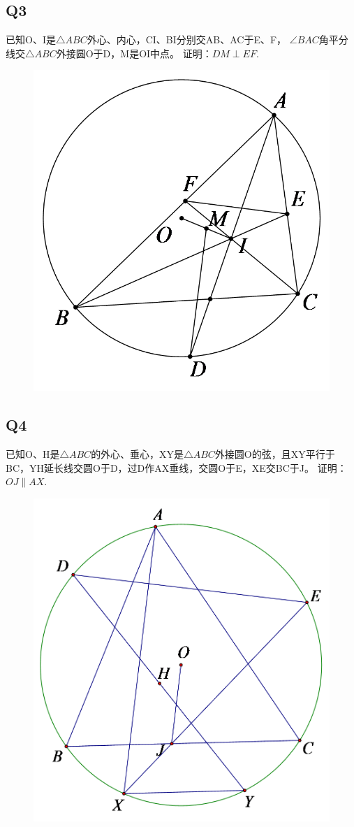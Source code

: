 \documentclass{article}
\begin{document}
\subsection{Q3}
已知O、I是$\triangle ABC$外心、内心，CI、BI分别交AB、AC于E、F，
$\angle BAC$角平分线交$\triangle ABC$外接圆O于D，M是OI中点。
证明：$DM \perp EF.$
\begin{figure}[htbp]
    \centering
    \includegraphics[width=0.6\linewidth]{figures/Q3.png}
\end{figure}



\newpage 
\subsection{Q4}
已知O、H是$\triangle ABC$的外心、垂心，XY是$\triangle ABC$外接圆O的弦，且XY平行于BC，YH延长线交圆O于D，过D作AX垂线，交圆O于E，XE交BC于J。
证明：$OJ\parallel AX.$
\begin{figure}[htbp]
    \centering
    \includegraphics[width=0.4\linewidth]{figures/Q4.png}
\end{figure}
\end{document}
